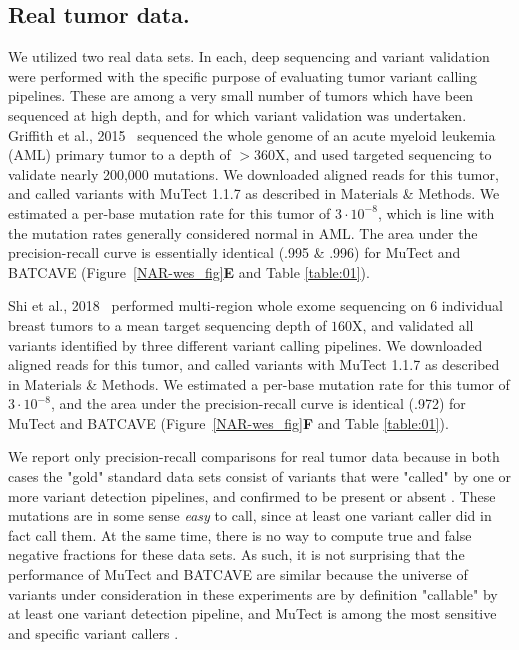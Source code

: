 \documentclass[a4,center,fleqn]{NAR}
\newcommand{\batcave}{BATCAVE }
\begin{document}
\subsection{Real tumor data.}
We utilized two real data sets.
In each, deep sequencing and variant validation were performed with the specific purpose of evaluating tumor variant calling pipelines.
These are among a very small number of tumors which have been sequenced at high depth, and for which variant validation was undertaken.
Griffith et al., 2015~\citep{Griffith2015} sequenced the whole genome of an acute myeloid leukemia (AML) primary tumor to a depth of $>360\mathrm{X}$, and used targeted sequencing to validate nearly 200,000 mutations.
We downloaded aligned reads for this tumor, and called variants with MuTect 1.1.7 as described in Materials \& Methods.
We estimated a per-base mutation rate for this tumor of $3\cdot10^{-8}$, which is line with the mutation rates generally considered normal in AML.
The area under the precision-recall curve is essentially identical (.995 \& .996) for MuTect and \batcave (Figure~\ref{NAR-wes_fig}\textbf{E} and Table \ref{table:01}).

Shi et al., 2018~\citep{Shi2018} performed multi-region whole exome sequencing on 6 individual breast tumors to a mean target sequencing depth of $160\mathrm{X}$, and validated all variants identified by three different variant calling pipelines.
We downloaded aligned reads for this tumor, and called variants with MuTect 1.1.7 as described in Materials \& Methods.
We estimated a per-base mutation rate for this tumor of $3\cdot10^{-8}$, and the area under the precision-recall curve is identical (.972) for MuTect and \batcave (Figure~\ref{NAR-wes_fig}\textbf{F} and Table \ref{table:01}).

We report only precision-recall comparisons for real tumor data because in both cases the "gold" standard data sets consist of variants that were "called" by one or more variant detection pipelines, and confirmed to be present or absent \cite{Griffith2015,Shi2018}.
These mutations are in some sense \textit{easy} to call, since at least one variant caller did in fact call them.
At the same time, there is no way to compute true and false negative fractions for these data sets.
As such, it is not surprising that the performance of MuTect and \batcave are similar because the universe of variants under consideration in these experiments are by definition "callable" by at least one variant detection pipeline, and MuTect is among the most sensitive and specific variant callers \cite{Griffith2015,Cibulskis2013}.
\end{document}
